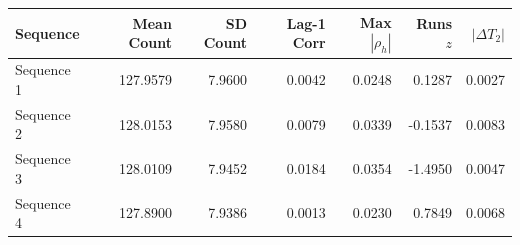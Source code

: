 \begin{tabular}{lrrrrrr}
\hline
Sequence & Mean Count & SD Count & Lag-1 Corr & Max $|\rho_h|$ & Runs $z$ & $|\Delta T_2|$ \\
\hline
Sequence 1 & 127.9579 & 7.9600 & 0.0042 & 0.0248 & 0.1287 & 0.0027 \\
Sequence 2 & 128.0153 & 7.9580 & 0.0079 & 0.0339 & -0.1537 & 0.0083 \\
Sequence 3 & 128.0109 & 7.9452 & 0.0184 & 0.0354 & -1.4950 & 0.0047 \\
Sequence 4 & 127.8900 & 7.9386 & 0.0013 & 0.0230 & 0.7849 & 0.0068 \\
\hline
\end{tabular}
